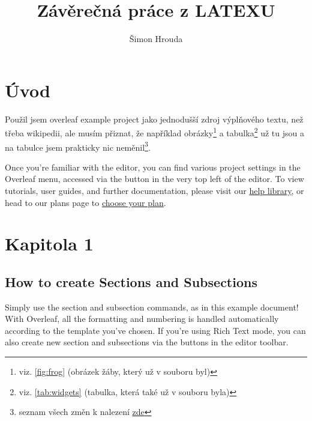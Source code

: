 \documentclass{article}
\title{Závěrečná práce z LATEXU}
\author{Šimon Hrouda}
\begin{document}
\maketitle

\thispagestyle{empty}
\newpage

\setcounter{page}{1}
\tableofcontents

\pagestyle{empty} %

\newpage

\pagestyle{plain}

\section{Úvod}

Použil jsem overleaf example project jako jednodušší zdroj výplňového textu, než třeba wikipedii, ale musím přiznat, že například obrázky\footnote{viz. \ref{fig:frog} (obrázek žáby, který už v souboru byl)} a tabulka\footnote{viz. \ref{tab:widgets} (tabulka, která také už v souboru byla)} už tu jsou a na tabulce jsem prakticky nic neměnil\footnote{seznam všech změn k nalezení \href{https://github.com/phuid/ZaverecnaPraceLATEX/commit/120b78cbb3d729f926c0c9c28e38ac66a1d4e94a}{zde}}.

Once you're familiar with the editor, you can find various project settings in the Overleaf menu, accessed via the button in the very top left of the editor. To view tutorials, user guides, and further documentation, please visit our \href{https://www.overleaf.com/learn}{help library}, or head to our plans page to \href{https://www.overleaf.com/user/subscription/plans}{choose your plan}.

\section{Kapitola 1}

\subsection{How to create Sections and Subsections}

Simply use the section and subsection commands, as in this example document! With Overleaf, all the formatting and numbering is handled automatically according to the template you've chosen. If you're using Rich Text mode, you can also create new section and subsections via the buttons in the editor toolbar.
\end{document}
